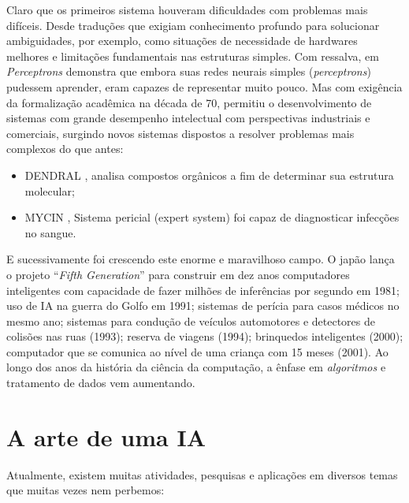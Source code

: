 \documentclass[
  openany]{book}
\begin{document}
Claro que os primeiros sistema houveram dificuldades com problemas mais difíceis. Desde traduções que exigiam conhecimento profundo para solucionar ambiguidades, por exemplo, como situações de necessidade de hardwares melhores e limitações fundamentais nas estruturas simples. Com ressalva, em \emph{Perceptrons} \citep{minsky1969perceptrons} demonstra que embora suas redes neurais simples (\emph{perceptrons}) pudessem aprender, eram capazes de representar muito pouco. Mas com exigência da formalização acadêmica na década de 70, permitiu o desenvolvimento de sistemas com grande desempenho intelectual com perspectivas industriais e comerciais, surgindo novos sistemas dispostos a resolver problemas mais complexos do que antes:

\begin{itemize}
\item
  DENDRAL \citep{buchanan1969heuristic}, analisa compostos orgânicos a fim de determinar sua estrutura molecular;
\item
  MYCIN \citep{buchanan1984rule}, Sistema pericial (expert system) foi capaz de diagnosticar infecções no sangue.
\end{itemize}

E sucessivamente foi crescendo este enorme e maravilhoso campo. O japão lança o projeto ``\emph{Fifth Generation}'' para construir em dez anos computadores inteligentes com capacidade de fazer milhões de inferências por segundo em 1981; uso de IA na guerra do Golfo em 1991; sistemas de perícia para casos médicos no mesmo ano; sistemas para condução de veículos automotores e detectores de colisões nas ruas (1993); reserva de viagens (1994); brinquedos inteligentes (2000); computador que se comunica ao nível de uma criança com 15 meses (2001). Ao longo dos anos da história da ciência da computação, a ênfase em \emph{algoritmos} e tratamento de dados vem aumentando.

\hypertarget{a-arte-de-uma-ia}{%
\section{A arte de uma IA}\label{a-arte-de-uma-ia}}

Atualmente, existem muitas atividades, pesquisas e aplicações em diversos temas que muitas vezes nem perbemos:
\end{document}
